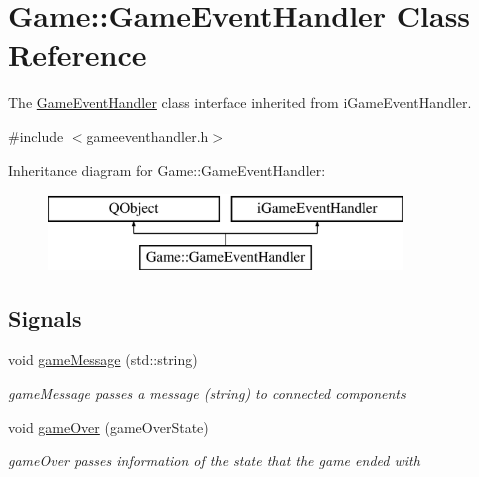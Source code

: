 \hypertarget{class_game_1_1_game_event_handler}{\section{Game\-:\-:Game\-Event\-Handler Class Reference}
\label{class_game_1_1_game_event_handler}
}


The \hyperlink{class_game_1_1_game_event_handler}{Game\-Event\-Handler} class interface inherited from i\-Game\-Event\-Handler.  




{\ttfamily \#include $<$gameeventhandler.\-h$>$}

Inheritance diagram for Game\-:\-:Game\-Event\-Handler\-:\begin{figure}[H]
\begin{center}
\leavevmode
\includegraphics[height=2.000000cm]{class_game_1_1_game_event_handler}
\end{center}
\end{figure}
\subsection*{Signals}
\begin{DoxyCompactItemize}
\item 
\hypertarget{class_game_1_1_game_event_handler_aa66e8120504a75349d8a4281758f2996}{void \hyperlink{class_game_1_1_game_event_handler_aa66e8120504a75349d8a4281758f2996}{game\-Message} (std\-::string)}\label{class_game_1_1_game_event_handler_aa66e8120504a75349d8a4281758f2996}

\begin{DoxyCompactList}\small\item\em game\-Message passes a message (string) to connected components \end{DoxyCompactList}\item 
\hypertarget{class_game_1_1_game_event_handler_a84188b624b591fb2d354e89e85fb81ba}{void \hyperlink{class_game_1_1_game_event_handler_a84188b624b591fb2d354e89e85fb81ba}{game\-Over} (game\-Over\-State)}\label{class_game_1_1_game_event_handler_a84188b624b591fb2d354e89e85fb81ba}

\begin{DoxyCompactList}\small\item\em game\-Over passes information of the state that the game ended with \end{DoxyCompactList}\end{DoxyCompactItemize}
